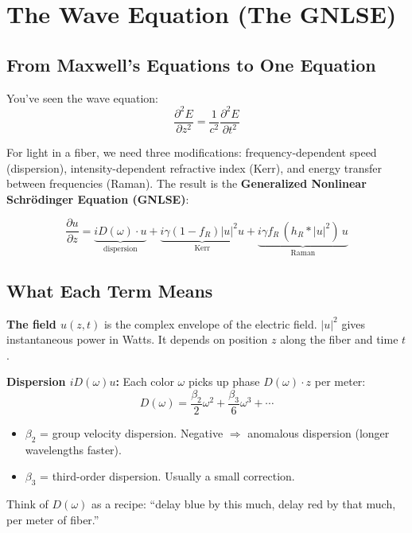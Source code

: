 \documentclass[12pt,a4paper]{article}
\newcommand{\pdv}[2]{\frac{\partial #1}{\partial #2}}
\begin{document}
\section{The Wave Equation (The GNLSE)}

\subsection{From Maxwell's Equations to One Equation}

You've seen the wave equation:
\begin{equation}
\frac{\partial^2 E}{\partial z^2} = \frac{1}{c^2}\frac{\partial^2 E}{\partial t^2}
\end{equation}

For light in a fiber, we need three modifications: frequency-dependent speed (dispersion), intensity-dependent refractive index (Kerr), and energy transfer between frequencies (Raman). The result is the \textbf{Generalized Nonlinear Schr\"odinger Equation (GNLSE)}:

\begin{keyeq}
\begin{equation}
\pdv{u}{z} = \underbrace{iD(\omega)\cdot u}_{\text{dispersion}} + \underbrace{i\gamma(1-f_R)|u|^2 u}_{\text{Kerr}} + \underbrace{i\gamma f_R\,(h_R * |u|^2)\,u}_{\text{Raman}}
\label{eq:gnlse}
\end{equation}
\end{keyeq}

\subsection{What Each Term Means}

\textbf{The field $u(z,t)$} is the complex envelope of the electric field. $|u|^2$ gives instantaneous power in Watts. It depends on position $z$ along the fiber and time $t$.

\textbf{Dispersion $iD(\omega)u$:} Each color $\omega$ picks up phase $D(\omega)\cdot z$ per meter:
\begin{equation}
D(\omega) = \frac{\beta_2}{2}\omega^2 + \frac{\beta_3}{6}\omega^3 + \cdots
\end{equation}
\begin{itemize}
    \item $\beta_2$ = group velocity dispersion. Negative $\Rightarrow$ anomalous dispersion (longer wavelengths faster).
    \item $\beta_3$ = third-order dispersion. Usually a small correction.
\end{itemize}
Think of $D(\omega)$ as a recipe: ``delay blue by this much, delay red by that much, per meter of fiber.''
\end{document}
